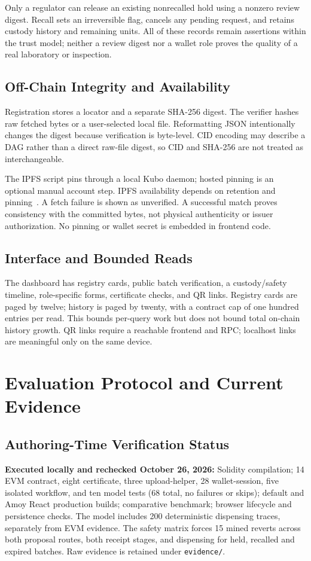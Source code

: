 Only a regulator can release an existing nonrecalled hold using a nonzero review digest. Recall sets an irreversible flag, cancels any pending request, and retains custody history and remaining units. All of these records remain assertions within the trust model; neither a review digest nor a wallet role proves the quality of a real laboratory or inspection.

\subsection{Off-Chain Integrity and Availability}
Registration stores a locator and a separate SHA-256 digest. The verifier hashes raw fetched bytes or a user-selected local file. Reformatting JSON intentionally changes the digest because verification is byte-level. CID encoding may describe a DAG rather than a direct raw-file digest, so CID and SHA-256 are not treated as interchangeable.

The IPFS script pins through a local Kubo daemon; hosted pinning is an optional manual account step. IPFS availability depends on retention and pinning~\cite{ipfs}. A fetch failure is shown as unverified. A successful match proves consistency with the committed bytes, not physical authenticity or issuer authorization. No pinning or wallet secret is embedded in frontend code.

\subsection{Interface and Bounded Reads}
The dashboard has registry cards, public batch verification, a custody/safety timeline, role-specific forms, certificate checks, and QR links. Registry cards are paged by twelve; history is paged by twenty, with a contract cap of one hundred entries per read. This bounds per-query work but does not bound total on-chain history growth. QR links require a reachable frontend and RPC; localhost links are meaningful only on the same device.

\section{Evaluation Protocol and Current Evidence}
\subsection{Authoring-Time Verification Status}
\textbf{Executed locally and rechecked October 26, 2026:} Solidity compilation; 14 EVM contract, eight certificate, three upload-helper, 28 wallet-session, five isolated workflow, and ten model tests (68 total, no failures or skips); default and Amoy React production builds; comparative benchmark; browser lifecycle and persistence checks. The model includes 200 deterministic dispensing traces, separately from EVM evidence. The safety matrix forces 15 mined reverts across both proposal routes, both receipt stages, and dispensing for held, recalled and expired batches. Raw evidence is retained under \texttt{evidence/}.

